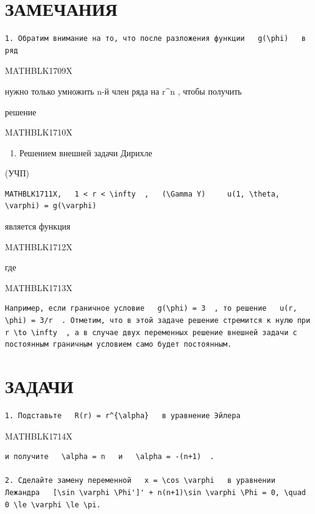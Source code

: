 \documentclass[
]{article}
\providecommand{\tightlist}{%
  \setlength{\itemsep}{0pt}\setlength{\parskip}{0pt}}
\begin{document}
\section{ЗАМЕЧАНИЯ}\label{ux437ux430ux43cux435ux447ux430ux43dux438ux44f-14}

\begin{verbatim}
1. Обратим внимание на то, что после разложения функции   g(\phi)   в ряд
\end{verbatim}

MATHBLK1709X

нужно только умножить n-й член ряда на r\^{}n , чтобы получить

решение

MATHBLK1710X

\begin{enumerate}
\def\labelenumi{\arabic{enumi}.}
\setcounter{enumi}{1}
\tightlist
\item
  Решением внешней задачи Дирихле
\end{enumerate}

(УЧП)

\begin{verbatim}
MATHBLK1711X,   1 < r < \infty  ,   (\Gamma Y)     u(1, \theta, \varphi) = g(\varphi)
\end{verbatim}

является функция

MATHBLK1712X

где

MATHBLK1713X

\begin{verbatim}
Например, если граничное условие   g(\phi) = 3  , то решение   u(r, \phi) = 3/r  . Отметим, что в этой задаче решение стремится к нулю при   r \to \infty  , а в случае двух переменных решение внешней задачи с постоянным граничным условием само будет постоянным.
\end{verbatim}

\section{ЗАДАЧИ}\label{ux437ux430ux434ux430ux447ux438-14}

\begin{verbatim}
1. Подставьте   R(r) = r^{\alpha}   в уравнение Эйлера
\end{verbatim}

MATHBLK1714X

\begin{verbatim}
и получите   \alpha = n   и   \alpha = -(n+1)  .

2. Сделайте замену переменной   x = \cos \varphi   в уравнении Лежандра   [\sin \varphi \Phi']' + n(n+1)\sin \varphi \Phi = 0, \quad 0 \le \varphi \le \pi.
\end{verbatim}
\end{document}
